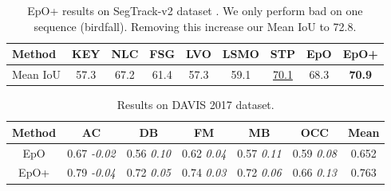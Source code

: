 \documentclass[10pt,twocolumn,letterpaper]{article}
\newcommand{\rowSpace}{\vspace{-0.4cm}}
\begin{document}
\setlength{\tabcolsep}{1.6pt}
\begin{table}
\begin{center}
\centering
\begin{tabular}{l|cccccccc}
\hline
\hline
Method & KEY & NLC & FSG & LVO & LSMO & STP & EpO & EpO+ \\
\hline
Mean IoU & 57.3 & 67.2 & 61.4 & 57.3 & 59.1 & \underline{70.1} & 68.3 & \bf{70.9} \\
\hline
\hline
\end{tabular}
\caption{EpO+ results on SegTrack-v2 dataset \cite{segtrackv2}. We only perform bad on one sequence (birdfall). Removing this increase our Mean IoU to 72.8. \label{tab:quantSegTrack}
}
\vspace{-0.3in}
\end{center}
\end{table}


\setlength{\tabcolsep}{1.0pt}
\begin{table}[!h]
\begin{center}
\centering
\begin{tabular}{c|cccccc}
\hline
\hline
Method & AC & DB & FM & MB & OCC &  Mean \\  
\hline
EpO & 0.67 \emph{\scriptsize{-0.02}} & 0.56 \emph{\scriptsize{0.10}} & 0.62 \emph{\scriptsize{0.04}} &  0.57 \emph{\scriptsize{0.11}} & 0.59 \emph{\scriptsize{0.08}} & 0.652 \\

EpO+ & 0.79 \emph{\scriptsize{-0.04}} & 0.72 \emph{\scriptsize{0.05}} & 0.74 \emph{\scriptsize{0.03}} &  0.72 \emph{\scriptsize{0.06}} & 0.66 \emph{\scriptsize{0.13}} & 0.763 \\
\hline
\hline
\end{tabular}
\caption{Results on DAVIS 2017 dataset.\label{Tab:DAVIS2017}}
\rowSpace
\rowSpace
\end{center}
\end{table}
\end{document}
